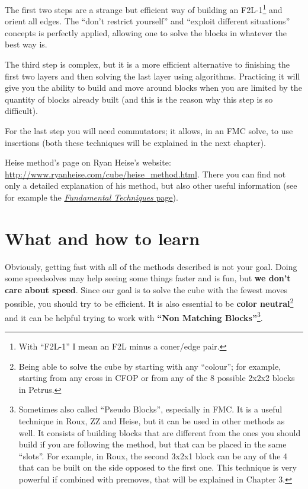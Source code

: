 \documentclass[11pt,a4paper]{book}
\begin{document}
The first two steps are a strange but efficient way of building an F2L-1\footnote{With ``F2L-1'' I mean an F2L minus a coner/edge pair.} and orient all edges. The ``don't restrict yourself'' and ``exploit different situations'' concepts is perfectly applied, allowing one to solve the blocks in whatever the best way is.

The third step is complex, but it is a more efficient alternative to finishing the first two layers and then solving the last layer using algorithms. Practicing it will give you the ability to build and move around blocks when you are limited by the quantity of blocks already built (and this is the reason why this step is so difficult).

For the last step you will need commutators; it allows, in an FMC solve, to use insertions (both these techniques will be explained in the next chapter).

Heise method's page on Ryan Heise's website: \url{http://www.ryanheise.com/cube/heise_method.html}. There you can find not only a detailed explanation of his method, but also other useful information (see for example the \href{http://www.ryanheise.com/cube/fundamental_techniques.html}{\emph{Fundamental Techniques} page}).

\section{What and how to learn}
Obviously, getting fast with all of the methods described is not your goal. Doing some speedsolves may help seeing some things faster and is fun, but \textbf{we don't care about speed}. Since our goal is to solve the cube with the fewest moves possible, you should try to be efficient. It is also essential to be \textbf{color neutral}\footnote{Being able to solve the cube by starting with any ``colour''; for example, starting from any cross in CFOP or from any of the 8 possible 2x2x2 blocks in Petrus.} and it can be helpful trying to work with \textbf{``Non Matching Blocks''}\footnote{Sometimes also called ``Pseudo Blocks'', especially in FMC. It is a useful technique in Roux, ZZ and Heise, but it can be used in other methods as well. It consists of building blocks that are different from the ones you should build if you are following the method, but that can be placed in the same ``slots''. For example, in Roux, the second 3x2x1 block can be any of the 4 that can be built on the side opposed to the first one. This technique is very powerful if combined with premoves, that will be explained in Chapter 3.}.
\end{document}

